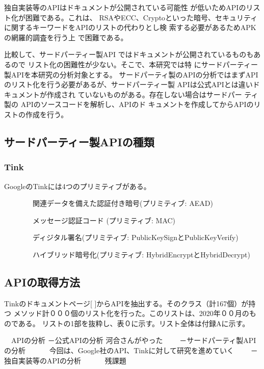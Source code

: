 独自実装等のAPIはドキュメントが公開されている可能性
が低いためAPIのリスト化が困難である。これは、
RSAやECC、Cryptoといった暗号、セキュリティ
に関するキーワードをAPIのリストの代わりとし検
索する必要があるためAPKの網羅的調査を行う上
で困難である。

比較して、サードパーティー製API
ではドキュメントが公開されているものもあるので
リスト化の困難性が少ない。そこで、本研究では特
にサードパーティー製APIを本研究の分析対象とする。
サードパーティ製のAPIの分析ではまずAPIのリスト化を行う必要があるが、サードパーティー製
APIは公式APIとは違いドキュメントが作成され
ていないものがある。存在しない場合はサードパー
ティ製の APIのソースコードを解析し、APIのド
キュメントを作成してからAPIのリストの作成を行う。





\subsection{サードパーティー製APIの種類}
\subsubsection{Tink}

GoogleのTinkには4つのプリミティブがある。

　　　　関連データを備えた認証付き暗号(プリミティブ: AEAD)

　　　　メッセージ認証コード (プリミティブ: MAC)

　　　　ディジタル署名(プリミティブ: PublicKeySignとPublicKeyVerify)

　　　　ハイブリッド暗号化(プリミティブ: HybridEncryptとHybridDecrypt)


\subsection{APIの取得方法}
Tinkのドキュメントページ[ ]からAPIを抽出する。そのクラス（計167個）が持つ
メソッド計０００個のリスト化を行った。このリストは、2020年００月のものである。
リストの1部を抜粋し、表０に示す。リスト全体は付録Aに示す。


\if
　APIの分析
－公式APIの分析
河合さんがやった
　　－サードパーティ製APIの分析
　　　今回は、Google社のAPI、Tinkに対して研究を進めていく
　　－独自実装等のAPIの分析
　　　残課題
\fi